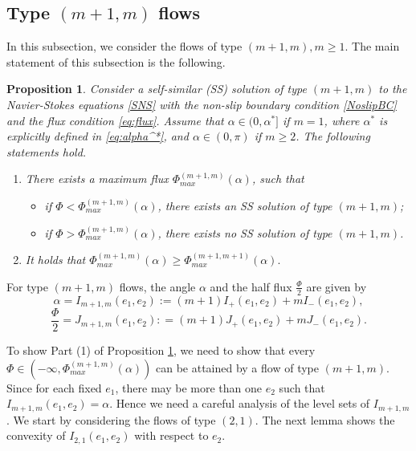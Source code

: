 \documentclass[reqno,12pt]{amsart}
\newtheorem{pro}[theorem]{Proposition}
\begin{document}
\subsection{Type $(m+1, m)$ flows}
In this subsection, we consider the flows of type $(m+1, m), m\geq 1$. The main statement of this subsection is the following. 
\begin{pro}\label{Protype21}
   Consider a self-similar (SS) solution of type $(m+1,m)$ to the Navier-Stokes equations \eqref{SNS} with the non-slip boundary condition \eqref{NoslipBC} and the flux condition \eqref{eq:flux}.
  Assume that {$\alpha \in (0, \alpha^*] $ if  $m =1$, where
 $\alpha^*$ is explicitly defined in \eqref{eq:alpha^*}, and $\alpha\in (0,\pi)$ if $m\geq 2$.} The following statements hold.
 \begin{enumerate}
        \item There exists a maximum flux  $\Phi_{max}^{(m+1, m)}(\alpha)$, such that 
        \begin{itemize}
            \item if $\Phi < \Phi_{max}^{(m+1, m)}(\alpha)$,  there exists an SS solution of type $(m+1, m)$; 

            \item if $\Phi >\Phi_{max}^{(m+1, m)}(\alpha)$, there exists no SS solution of type $(m+1, m)$. 
        \end{itemize}

\item It holds that $\Phi_{max}^{(m+1, m) }(\alpha) \geq \Phi_{max}^{(m+1, m+1)}(\alpha).$
        \end{enumerate}
  
\end{pro}



 
For type $(m+1, m)$ flows, the angle $\alpha$ and the half flux $\frac{\Phi}{2}$ are given by
\begin{equation}\label{type21-1}\nonumber
\alpha = I_{m+1,m} (e_1, e_2) := (m+1)I_{+}(e_1, e_2) + mI_{-}(e_1, e_2) , 
\end{equation}
\begin{equation}\label{type21-2}\nonumber
\frac{\Phi}{2}=  J_{m+1, m}(e_1, e_2): = (m+1)J_{+}(e_1, e_2) + mJ_{-}(e_1, e_2). 
\end{equation} 

To show Part (1) of Proposition \ref{Protype21}, we need to show that  every $\Phi\in (-\infty,\Phi_{max}^{(m+1,m)}(\alpha))$ can be attained by a flow of type $(m+1,m)$.  Since for each fixed $e_1$, there may be more than one $e_2$ such that $I_{m+1,m}(e_1,e_2)=\alpha$. Hence we need a careful analysis of the level sets of $I_{m+1, m}$. We start by
considering the flows of type $(2,1)$.
The next lemma shows the convexity of $I_{2,1}(e_1,e_2)$ with respect to $e_2$.
\end{document}
